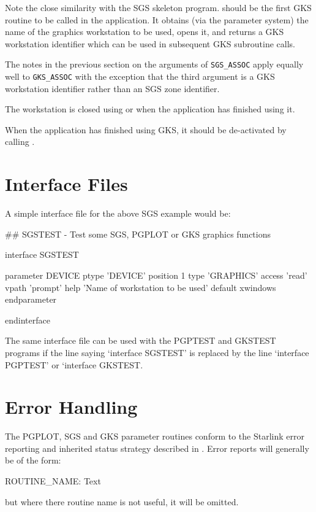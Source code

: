 \documentclass[twoside,11pt,nolof]{starlink}
\begin{document}
Note the close similarity with the SGS skeleton program.
 should be
the first GKS routine to be called in the application. It obtains (via the
parameter system) the name of the graphics workstation to be used, opens it,
and returns a GKS workstation identifier which can be used in subsequent GKS
subroutine calls.

The notes in the previous section on the arguments of \texttt{SGS\_ASSOC}
 apply equally
well to \texttt{GKS\_ASSOC} with the exception that the third argument is a GKS
workstation identifier rather than an SGS zone identifier.

The workstation is closed using
 or
when the application has finished using it.

When the application has finished using GKS, it should be de-activated by
calling .

\section{Interface Files}
\label{ifl}
A simple interface file for the above SGS example would be:
\begin{small}
\begin{terminalv}
## SGSTEST - Test some SGS, PGPLOT or GKS graphics functions

interface SGSTEST

   parameter      DEVICE
      ptype       'DEVICE'
      position    1
      type        'GRAPHICS'
      access      'read'
      vpath       'prompt'
      help        'Name of workstation to be used'
      default     xwindows
   endparameter

endinterface
\end{terminalv}
\end{small}

The same interface file can be used with the PGPTEST and GKSTEST programs if
the line saying `interface SGSTEST' is replaced by the line `interface
PGPTEST' or `interface GKSTEST.

\section{Error Handling}
\label{errhnd}
The PGPLOT, SGS and GKS parameter routines conform to the Starlink error
reporting and inherited status strategy described in .
Error reports will generally be of the form:
\begin{terminalv}
ROUTINE_NAME: Text
\end{terminalv}
but where there routine name is not useful, it will be omitted.
\end{document}
